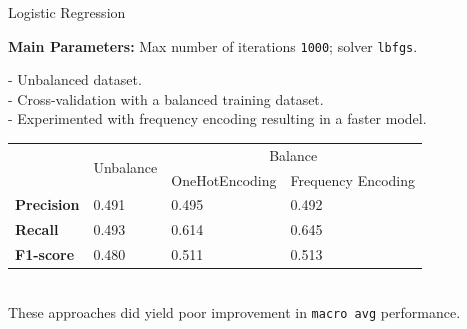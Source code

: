\documentclass[12pt,aspectratio=169,notheorems]{beamer}
\begin{document}
\begin{frame}{Logistic Regression}
    \begin{center}
        \textbf{Main Parameters:} 
        Max number of iterations \texttt{1000}; solver \texttt{lbfgs}. \\
    \end{center}    
        - Unbalanced dataset. \\
        - Cross-validation with a balanced training dataset. \\
        - Experimented with frequency encoding resulting in a faster model.
        \vspace{0.2cm}
    \begin{table}[]
        \begin{tabular}{|l|l|ll|}
        \hline
            & \multicolumn{1}{c|}{\multirow{2}{*}{Unbalance}} & \multicolumn{2}{c|}{Balance}                             \\ \cline{3-4}
            & \multicolumn{1}{c|}{}                            & \multicolumn{1}{l|}{OneHotEncoding} & Frequency Encoding \\ \hline
            \multicolumn{1}{|l|}{\textbf{Precision}} & 0.491                                             & \multicolumn{1}{l|}{0.495}           & 0.492               \\ \hline
            \multicolumn{1}{|l|}{\textbf{Recall}}    & 0.493                                             & \multicolumn{1}{l|}{0.614}           & 0.645               \\ \hline
            \multicolumn{1}{|l|}{\textbf{F1-score}}  & 0.480                                            & \multicolumn{1}{l|}{0.511}           & 0.513               \\ \hline
        \end{tabular}
        \\
        \vspace{0.4cm}
        These approaches did yield poor improvement in \texttt{macro avg} performance.
    \end{table}
\end{frame}
\end{document}
